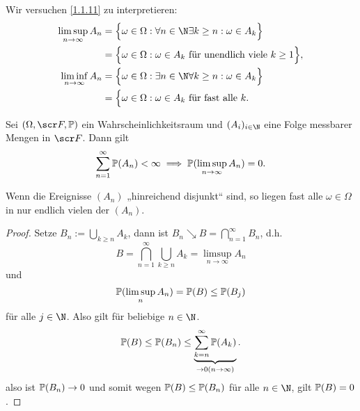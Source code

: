 \begin{nt} \label{1.1.12}
	Wir versuchen \ref{1.1.11} zu interpretieren:
	\begin{align*}
		\limsup_{n\to\infty} A_n
			&= \Big\{ \omega \in \Omega : \forall n \in \N \exists k \ge n : \omega \in A_k \Big\} \\
			&= \Big\{ \omega \in \Omega : \omega \in A_k \text{ für unendlich viele $k \ge 1$} \Big\}, \\
		\liminf_{n\to\infty} A_n
			&= \Big\{ \omega \in \Omega : \exists n \in \N \forall k \ge n : \omega \in A_k \Big\} \\
			&= \Big\{ \omega \in \Omega : \omega \in A_k \text{ für fast alle $k$}.
	\end{align*}
\end{nt}

\begin{st} \label{1.1.13}
	Sei $(\Omega, \scr F, \P)$ ein Wahrscheinlichkeitsraum und $(A_i)_{i\in\N}$ eine Folge messbarer Mengen in $\scr F$.
	Dann gilt
	\[
		\sum_{n=1}^\infty \P(A_n) < \infty
		\implies
		\P(\limsup_{n\to \infty} A_n) = 0.
	\]
	\begin{nt*}[Interpretation]
		Wenn die Ereignisse $(A_n)$ „hinreichend disjunkt“ sind, so liegen fast alle $\omega \in \Omega$ in nur endlich vielen der $(A_n)$.
	\end{nt*}
	\begin{proof}
		Setze $B_n := \bigcup_{k \ge n} A_k$, dann ist $B_n \searrow B = \bigcap_{n=1}^\infty B_n$, d.h.
		\[
			B
			= \bigcap_{n=1}^\infty \bigcup_{k\ge n} A_k
			= \limsup_{n\to\infty} A_n
		\]
		und
		\[
			\P(\limsup_{n} A_n)
			= \P(B)
			\le \P(B_j)
		\]
		für alle $j \in \N$.
		Also gilt für beliebige $n \in \N$.
		\[
			\P(B)
			\le \P(B_n)
			\le \underbrace{\sum_{k=n}^\infty \P(A_k)}_{\to 0 (n\to\infty)}.
		\]
		also ist $\P(B_n) \to 0$ und somit wegen $\P(B) \le \P(B_n)$ für alle $n\in \N$, gilt $\P(B) = 0$.
	\end{proof}
\end{st}

